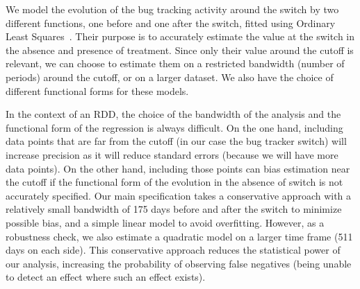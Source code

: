 \documentclass[conference]{IEEEtran}
\begin{document}
We model the evolution of the bug tracking activity around the switch by two different functions, one before and one after the switch, fitted using Ordinary Least Squares~\cite{wooldridge2015introductory}. Their purpose is to accurately estimate the value at the switch in the absence and presence of treatment. Since only their value around the cutoff is relevant, we can choose to estimate them on a restricted bandwidth (number of periods) around the cutoff, or on a larger dataset. We also have the choice of different functional forms for these models.

In the context of an RDD, the choice of the bandwidth of the analysis and the functional form of the regression is always difficult. On the one hand, including data points that are far from the cutoff (in our case the bug tracker switch) will increase precision as it will reduce standard errors (because we will have more data points). On the other hand, including those points can bias estimation near the cutoff if the functional form of the evolution in the absence of switch is not accurately specified. Our main specification takes a conservative approach with a relatively small bandwidth of 175 days before and after the switch to minimize possible bias, and a simple linear model to avoid overfitting. However, as a robustness check, we also estimate a quadratic model on a larger time frame (511 days on each side). This conservative approach reduces the statistical power of our analysis, increasing the probability of observing false negatives (being unable to detect an effect where such an effect exists).
\end{document}
